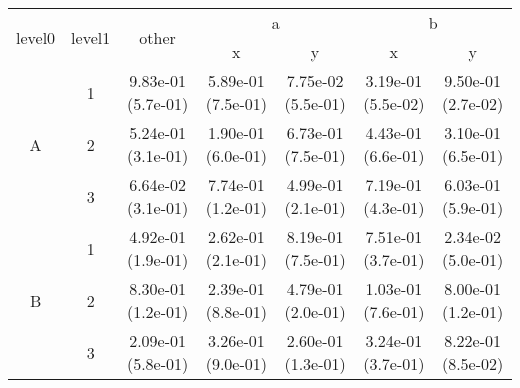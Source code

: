\begin{tabular}{ccccccc}
\toprule
\multirow{2}{*}{level0} & \multirow{2}{*}{level1}& \multirow{2}{*}{other}&\multicolumn{2}{c}{a}&\multicolumn{2}{c}{b}\tabularnewline
\cmidrule(lr){4-5}
\cmidrule(lr){6-7}
&&&x&y&x&y\tabularnewline
\midrule
\multirow{3}{*}{A}&1& 9.83e-01 (5.7e-01)& 5.89e-01 (7.5e-01)& 7.75e-02 (5.5e-01)& 3.19e-01 (5.5e-02)& 9.50e-01 (2.7e-02)\tabularnewline
&2& 5.24e-01 (3.1e-01)& 1.90e-01 (6.0e-01)& 6.73e-01 (7.5e-01)& 4.43e-01 (6.6e-01)& 3.10e-01 (6.5e-01)\tabularnewline
&3& 6.64e-02 (3.1e-01)& 7.74e-01 (1.2e-01)& 4.99e-01 (2.1e-01)& 7.19e-01 (4.3e-01)& 6.03e-01 (5.9e-01)\tabularnewline
\midrule
\multirow{3}{*}{B}&1& 4.92e-01 (1.9e-01)& 2.62e-01 (2.1e-01)& 8.19e-01 (7.5e-01)& 7.51e-01 (3.7e-01)& 2.34e-02 (5.0e-01)\tabularnewline
&2& 8.30e-01 (1.2e-01)& 2.39e-01 (8.8e-01)& 4.79e-01 (2.0e-01)& 1.03e-01 (7.6e-01)& 8.00e-01 (1.2e-01)\tabularnewline
&3& 2.09e-01 (5.8e-01)& 3.26e-01 (9.0e-01)& 2.60e-01 (1.3e-01)& 3.24e-01 (3.7e-01)& 8.22e-01 (8.5e-02)\tabularnewline
\bottomrule
\end{tabular}
